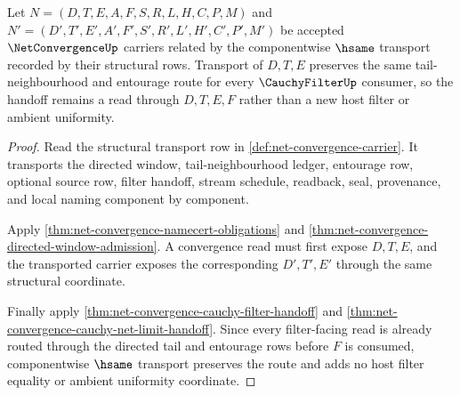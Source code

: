 \begin{theorem}
\label{thm:net-convergence-entourage-tail-stability}
Let $N=(D,T,E,A,F,S,R,L,H,C,P,M)$ and $N'=(D',T',E',A',F',S',R',L',H',C',P',M')$ be accepted $\NetConvergenceUp$ carriers related by the componentwise $\hsame$ transport recorded by their structural rows. Transport of $D,T,E$ preserves the same tail-neighbourhood and entourage route for every $\CauchyFilterUp$ consumer, so the handoff remains a read through $D,T,E,F$ rather than a new host filter or ambient uniformity.
\end{theorem}
\begin{proof}
Read the structural transport row in \autoref{def:net-convergence-carrier}. It transports the directed window, tail-neighbourhood ledger, entourage row, optional source row, filter handoff, stream schedule, readback, seal, provenance, and local naming component by component.

Apply \autoref{thm:net-convergence-namecert-obligations} and \autoref{thm:net-convergence-directed-window-admission}. A convergence read must first expose $D,T,E$, and the transported carrier exposes the corresponding $D',T',E'$ through the same structural coordinate.

Finally apply \autoref{thm:net-convergence-cauchy-filter-handoff} and \autoref{thm:net-convergence-cauchy-net-limit-handoff}. Since every filter-facing read is already routed through the directed tail and entourage rows before $F$ is consumed, componentwise $\hsame$ transport preserves the route and adds no host filter equality or ambient uniformity coordinate.
\end{proof}

